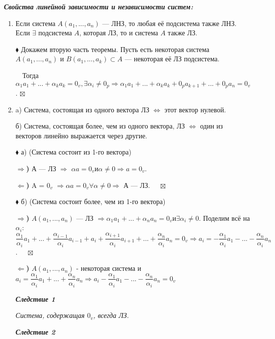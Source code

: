 \documentclass[a4paper, 12pt]{report}
\begin{document}
	\textit{\textbf{Свойства линейной зависимости и независимости систем:}}
	\begin{enumerate}
		\item Если система $A(a_1, ..., a_n)$ --- ЛНЗ, то любая её подсистема также ЛНЗ. Если $\exists$ подсистема $A$, которая ЛЗ, то и система $A$ также ЛЗ.
		
		$\blacklozenge$ Докажем вторую часть теоремы. Пусть есть некоторая система $A(a_1, ..., a_n)$ и $B(a_1, ..., a_k) \subset A$ --- некоторая её ЛЗ подсистема. 
		\par
		$\quad$Тогда $\alpha_1 a_1 + ... + \alpha_k a_k = 0_v, \exists \alpha_i \ne 0_p \Rightarrow \alpha_1 a_1 + ... + \alpha_k a_k + 0_pa_{k+1} + ... + 0_pa_{n} = 0_v$. $\boxtimes$
		\item a) Система, состоящая из одного вектора ЛЗ $\Longleftrightarrow$ этот вектор нулевой. 
		
		б) Система, состоящая более, чем из одного вектора, ЛЗ $\Longleftrightarrow$ один из векторов линейно выражается через другие.
		\par\bigskip
		$\blacklozenge$ а) (Система состоит из 1-го вектора)
		
		\textbf{$\Rightarrow$)} А --- ЛЗ $\Rightarrow$ $\alpha a = 0_v и \alpha \ne 0 \Rightarrow a = 0_v$.
		
		\textbf{$\Leftarrow$)} A = {$0_v$} $\Rightarrow \alpha a = 0_v \forall \alpha \ne 0 \Rightarrow$ А --- ЛЗ. $\quad\boxtimes$ 
		
		$\blacklozenge$ б) (Система состоит более, чем из 1-го вектора)
		
		\textbf{$\Rightarrow$)} $A(a_1, ..., a_n)$ --- ЛЗ $\Rightarrow \alpha_1 a_1 + ... + \alpha_n a_n = 0_v и \exists \alpha_i \ne 0$. Поделим всё на $\alpha_i$: $\dfrac{\alpha_1}{\alpha_i}a_1 + ... + \dfrac{\alpha_{i-1}}{\alpha_i}a_{i-1} + a_i + \dfrac{\alpha_{i+1}}{\alpha_i}a_{i+1} + ... + \dfrac{\alpha_n}{\alpha_i}a_n = 0_v \Rightarrow a_i = - \dfrac{\alpha_1}{\alpha_i}a_1 - ... - \dfrac{\alpha_n}{\alpha_i}a_n$. $\quad\boxtimes$ 
		
		\textbf{$\Leftarrow$)} $A(a_1, ..., a_n)$ - некоторая система и $a_i = \dfrac{\alpha_1}{\alpha_i}a_1 + ... + \dfrac{\alpha_n}{\alpha_i}a_n \Rightarrow a_i - \dfrac{\alpha_1}{\alpha_i}a_1 - ... - \dfrac{\alpha_n}{\alpha_i}a_n = 0_v$
		
		\textbf{\textit{Следствие 1}}
		
		\textit{Система, содержащая $0_v$, всегда ЛЗ.}
		
		\textbf{\textit{Следствие 2}}
		

\end{enumerate}
\end{document}
